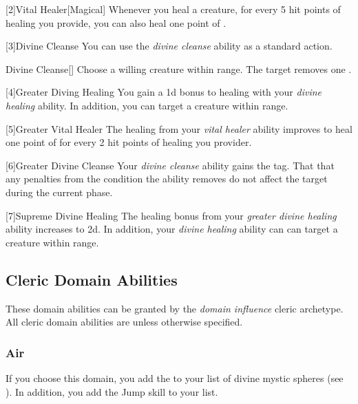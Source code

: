         [2]{Vital Healer}[Magical] Whenever you heal a creature, for every 5 hit points of healing you provide, you can also heal one point of .

        [3]{Divine Cleanse} You can use the \textit{divine cleanse} ability as a standard action.
        \begin{freeability}{Divine Cleanse}[]
            Choose a willing creature within \rngclose range.
            The target removes one .
        \end{freeability}

        [4]{Greater Diving Healing} You gain a \plus1d bonus to healing with your \textit{divine healing} ability.
        In addition, you can target a creature within \rngclose range.

        [5]{Greater Vital Healer} The healing from your \textit{vital healer} ability improves to heal one point of  for every 2 hit points of healing you provider.

        [6]{Greater Divine Cleanse} Your \textit{divine cleanse} ability gains the  tag.
        That that any penalties from the condition the ability removes do not affect the target during the current phase.

        [7]{Supreme Divine Healing} The healing bonus from your \textit{greater divine healing} ability increases to \plus2d.
        In addition, your \textit{divine healing} ability can can target a creature within \rngmed range.

    \subsection{Cleric Domain Abilities}\label{Cleric Domain Abilities}
        These domain abilities can be granted by the \textit{domain influence} cleric archetype.
        All cleric domain abilities are  unless otherwise specified.

        \subsubsection{Air}
            If you choose this domain, you add the   to your list of divine mystic spheres (see ).
            In addition, you add the Jump skill to your  list.

